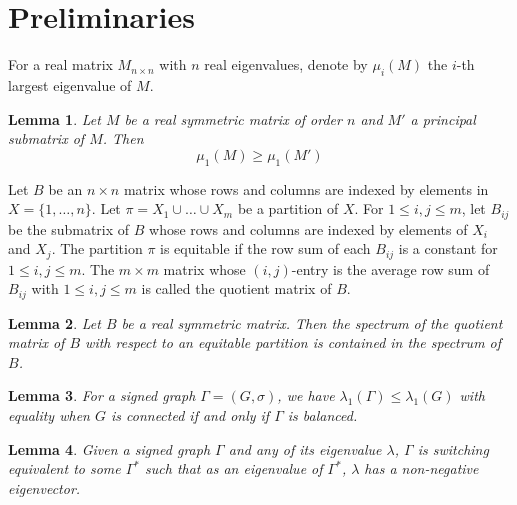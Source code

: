 \documentclass[12pt]{article}
\numberwithin{equation}{section}
\newtheorem {Lemma}{Lemma}[section]
\begin{document}
\section{Preliminaries}



For a real matrix $M_{n\times n}$ with $n$ real eigenvalues, denote by  $\mu_i(M)$ the $i$-th largest eigenvalue of $M$.


\begin{Lemma}\label{interlace}\cite{HJ}
Let $M$ be a real symmetric matrix of order $n$ and $M'$ a principal submatrix of $M$. Then 
\[
\mu_1(M)\ge \mu_1(M')
\]
\end{Lemma}


Let $B$ be an $n\times n$ matrix whose rows and columns are indexed by elements in $X=\{1, \dots, n\}$.  Let $\pi=X_1\cup \dots\cup X_m$ be a partition of $X$. For $1\le i,j\le m$, let $B_{ij}$ be the submatrix of $B$ whose rows and columns are indexed by elements of $X_i$ and $X_j$. The partition $\pi$ is equitable if the row sum of each $B_{ij}$ is a constant for $1\le i,j\le m$. The $m\times m$ matrix whose $(i,j)$-entry is the average row sum of $B_{ij}$ with $1\le i,j\le m$ is called the quotient matrix of $B$.



\begin{Lemma}\label{QM}\cite[Lemma 2.3.1]{BH}
Let $B$ be a real symmetric matrix. Then the spectrum of the quotient matrix of $B$ with respect to an equitable partition is contained in the spectrum of $B$.
\end{Lemma}



\begin{Lemma}\label{under}\cite{St1}
For a signed graph $\Gamma=(G,\sigma)$, we have $\lambda_1(\Gamma)\le\lambda_1(G)$ with equality when $G$ is connected if and only if $\Gamma$ is balanced.
\end{Lemma}



\begin{Lemma}\label{L+}\cite{Stan,SL}
Given a signed graph $\Gamma$ and any of its eigenvalue $\lambda$, $\Gamma$  is switching equivalent to some $\Gamma^*$ such that as an eigenvalue of $\Gamma^*$, $\lambda$ has a non-negative eigenvector.
\end{Lemma}
\end{document}
